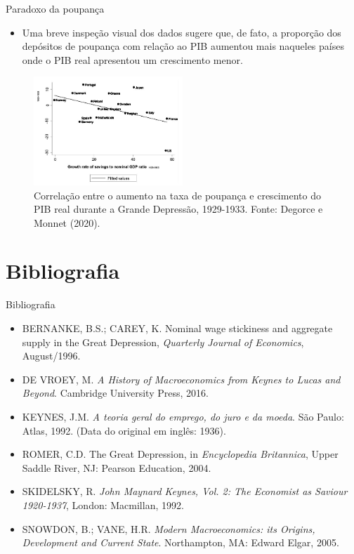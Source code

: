 \documentclass[10pt]{beamer}
\begin{document}
\begin{frame}{Paradoxo da poupança}
    \begin{itemize}
        \item Uma breve inspeção visual dos dados sugere que, de fato, a proporção dos depósitos de poupança com relação ao PIB aumentou mais naqueles países onde o PIB real apresentou um crescimento menor.
    \end{itemize}
    \begin{figure}
        \centering
        \includegraphics[width=0.5\textwidth]{./figures/aula4_fig6}
        \caption{Correlação entre o aumento na taxa de poupança e crescimento do PIB real durante a Grande Depressão, 1929-1933. Fonte: Degorce e Monnet (2020).}        
    \end{figure}
\end{frame}

\section{Bibliografia}
\begin{frame}{ Bibliografia}
    \begin{itemize}
        \item BERNANKE, B.S.; CAREY, K. Nominal wage stickiness and aggregate supply in the Great Depression, \emph{Quarterly Journal of Economics}, August/1996.\medskip
        \item DE VROEY, M. \emph{A History of Macroeconomics from Keynes to Lucas and Beyond}. Cambridge University Press, 2016.\medskip
        \item KEYNES, J.M. \emph{A teoria geral do emprego, do juro e da moeda}. São Paulo: Atlas, 1992. (Data do original em inglês: 1936).\medskip
        \item ROMER, C.D. The Great Depression, in \emph{Encyclopedia Britannica}, Upper Saddle River, NJ: Pearson Education, 2004.\medskip
        \item SKIDELSKY, R. \emph{John Maynard Keynes, Vol. 2: The Economist as Saviour 1920-1937}, London: Macmillan, 1992.\medskip
        \item SNOWDON, B.; VANE, H.R. \emph{Modern Macroeconomics: its Origins, Development and Current State}. Northampton, MA: Edward Elgar, 2005.
    \end{itemize}
\end{frame}
\end{document}
